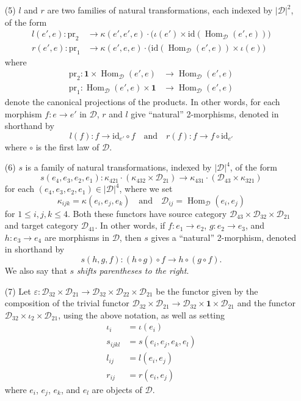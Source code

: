 \documentclass{article}
\newcommand{\oldpage}[1]{\marginpar{\footnotesize$\Big\vert$ \textit{p.~#1}}}
\newcommand{\id}{\mathrm{id}}
\newcommand{\textand}{\quad\text{and}\quad}
\newcommand{\pr}{\mathrm{pr}}
\newcommand{\cat}[1]{\mathcal{#1}}
\newcommand{\set}[1]{|#1|}
\DeclareMathOperator{\Hom}{Hom}
\begin{document}
\begin{enumerate}
  \item[(5)]
    \oldpage{244}
    $l$ and $r$ are two families of natural transformations, each indexed by $\set{\cat{D}}^2$, of the form
    \[
      \begin{aligned}
        l(e',e)\colon \pr_2
      & \to \kappa(e',e',e)\cdot\big(\iota(e')\times\id(\Hom_\cat{D}(e',e))\big)
      \\r(e',e)\colon \pr_1
      & \to \kappa(e',e,e)\cdot\big(\id(\Hom_\cat{D}(e',e))\times\iota(e)\big)
      \end{aligned}
    \]
    where
    \[
      \begin{aligned}
        \pr_2\colon \mathbf{1}\times\Hom_\cat{D}(e',e)
      & \to \Hom_\cat{D}(e',e)
      \\\pr_1\colon \Hom_\cat{D}(e',e)\times\mathbf{1}
      & \to \Hom_\cat{D}(e',e)
      \end{aligned}
    \]
    denote the canonical projections of the products.
    In other words, for each morphism $f\colon e\to e'$ in $\cat{D}$, $r$ and $l$ give ``natural'' 2-morphisms, denoted in shorthand by
    \[
      l(f)\colon f\to\id_{e'}\circ f
      \textand
      r(f)\colon f\to f\circ\id_{e'}
    \]
    where $\circ$ is the first law of $\cat{D}$.

  \item[(6)]
    $s$ is a family of natural transformations, indexed by $\set{\cat{D}}^4$, of the form
    \[
      s(e_4,e_3,e_2,e_1)\colon
      \kappa_{421}\cdot(\kappa_{432}\times\cat{D}_{21})
      \to \kappa_{431}\cdot(\cat{D}_{43}\times\kappa_{321})
    \]
    for each $(e_4,e_3,e_2,e_1)\in\set{\cat{D}}^4$, where we set
    \[
      \kappa_{ijk} = \kappa(e_i,e_j,e_k)
      \textand
      \cat{D}_{ij} = \Hom_\cat{D}(e_i,e_j)
    \]
    for $1\leqslant i,j,k\leqslant 4$.
    Both these functors have source category $\cat{D}_{43}\times\cat{D}_{32}\times\cat{D}_{21}$ and target category $\cat{D}_{41}$.
    In other words, if $f\colon e_1\to e_2$, $g\colon e_2\to e_3$, and $h\colon e_3\to e_4$ are morphisms in $\cat{D}$, then $s$ gives a ``natural'' 2-morphism, denoted in shorthand by
    \[
      s(h,g,f)\colon (h\circ g)\circ f
      \to h\circ(g\circ f).
    \]
    We also say that $s$ \emph{shifts parentheses to the right}.

  \item[(7)]
    Let $\varepsilon\colon\cat{D}_{32}\times\cat{D}_{21}\to\cat{D}_{32}\times\cat{D}_{22}\times\cat{D}_{21}$ be the functor given by the composition of the trivial functor $\cat{D}_{32}\times\cat{D}_{21}\to\cat{D}_{32}\times\mathbf{1}\times\cat{D}_{21}$ and the functor $\cat{D}_{32}\times\iota_2\times\cat{D}_{21}$, using the above notation, as well as setting
    \[
      \begin{aligned}
        \iota_i
      & = \iota(e_i)
      \\s_{ijkl}
      & = s(e_i,e_j,e_k,e_l)
      \\l_{ij}
      & = l(e_i,e_j)
      \\r_{ij}
      & = r(e_i,e_j)
      \end{aligned}
    \]
    where $e_i$, $e_j$, $e_k$, and $e_l$ are objects of $\cat{D}$.


\end{enumerate}
\end{document}
